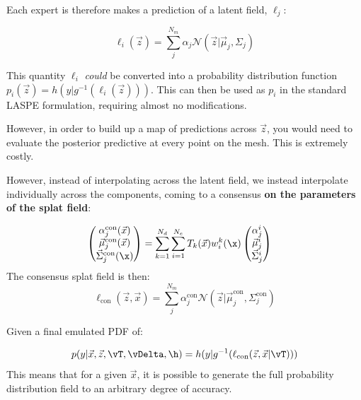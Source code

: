         Each expert is therefore makes a prediction of a latent field, $\ell_j$:
        
        \begin{equation}
            \ell_i(\vec{z}) = \sum_j^{N_m} \alpha_j \mathcal{N}(\vec{z} | \vec{\mu}_j, \Sigma_j)
        \end{equation}

        \begin{aside}
            This quantity $\ell_i$ \textit{could} be converted into a probability distribution function $p_i(\vec{z}) = h(y | g^{-1}(\ell_i(\vec{z})))$. This can then be used as $p_i$ in the standard LASPE formulation, requiring almost no modifications. 

            However, in order to build up a map of predictions across $\vec{z}$, you would need to evaluate the posterior predictive at every point on the mesh. This is extremely costly.             
        \end{aside}
        However, instead of interpolating across the latent field, we instead interpolate individually across the components, coming to a consensus \textbf{on the parameters of the splat field}:


        
        \begin{align}
            \begin{pmatrix}\alpha_j^\text{con}(\vec{x}) \\ \vec{\mu}_j^\text{con}(\vec{x}) \\ \vec{\Sigma}_j^\text{con}(\x)\end{pmatrix} 
            & = 
            \sum_{k=1}^{N_d}\sum_{i=1}^{N_e} T_k(\vec{x}) w_i^k(\x)   \begin{pmatrix}\alpha_j^i\\ \vec{\mu}_j^i\\ \vec{\Sigma}_j^i\end{pmatrix}
        \end{align}
        The consensus splat field is then:
        \begin{equation}
            \ell_\text{con}(\vec{z},\vec{x}) = \sum_j^{N_m} \alpha_j^\text{con}\mathcal{N}(\vec{z} | \vec{\mu}^\text{con}_j, \Sigma_j^\text{con})
        \end{equation}
        
        Given a final emulated PDF of:

        \begin{equation}
            p(y | \vec{x},\vec{z},\vT,\vDelta,\h) = h(y | g^{-1}(\ell_\text{con}(\vec{z},\vec{x} | \vT)))
        \end{equation}
        This means that for a given $\vec{x}$, it is possible to generate the full probability distribution field to an arbitrary degree of accuracy.

